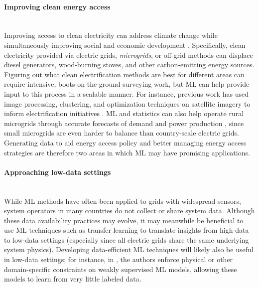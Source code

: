 \documentclass[11pt]{report}
\newcommand{\Gap}{\texorpdfstring{\hfill}{}}
\newcommand{\Rec}{\texorpdfstring{{\small\emph{\color{blue}{\fbox{High Leverage}}}}}{}}
\begin{document}
\paragraph{Improving clean energy access}\mbox{}\\ 
Improving access to clean electricity can address climate change while simultaneously improving social and economic development \cite{khandker2009welfare1, khandker2009welfare2}. Specifically, clean electricity provided via electric grids, \emph{microgrids}, or off-grid methods can displace diesel generators, wood-burning stoves, and other carbon-emitting energy sources. Figuring out what clean electrification methods are best for different areas can require intensive, boots-on-the-ground surveying work, but ML can help provide input to this process in a scalable manner. For instance, previous work has used image processing, clustering, and optimization techniques on satellite imagery to inform electrification initiatives \cite{ellman2015reference}. ML and statistics can also help operate rural microgrids through accurate forecasts of demand and power production \cite{cenek2018climate, otieno2018forecasting}, since small microgrids are even harder to balance than country-scale electric grids. Generating data to aid energy access policy and better managing energy access strategies are therefore two areas in which ML may have promising applications.

\paragraph{Approaching low-data settings}\Gap\textbf{\Rec}\mbox{}\\
While ML methods have often been applied to grids with widespread sensors, system operators in many countries do not collect or share system data. Although these data availability practices may evolve, it may meanwhile be beneficial to use ML techniques such as transfer learning to translate insights from high-data to low-data settings (especially since all electric grids share the same underlying system physics). Developing data-efficient ML techniques will likely also be useful in low-data settings; for instance, in \cite{ren2018learning}, the authors enforce physical or other domain-specific constraints on weakly supervised ML models, allowing these models to learn from very little labeled data. 
\end{document}
